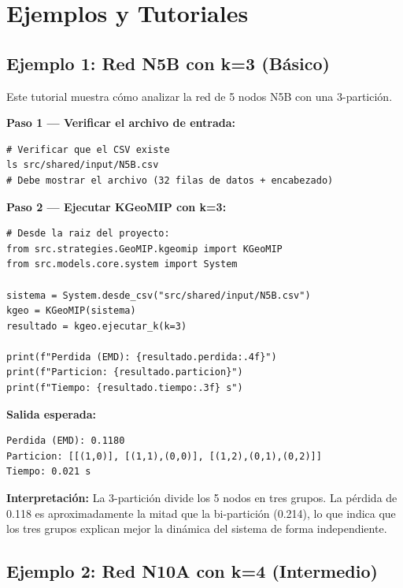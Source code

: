 \section{Ejemplos y Tutoriales}
\label{sec:ejemplos}

\subsection{Ejemplo 1: Red N5B con k=3 (Básico)}

Este tutorial muestra cómo analizar la red de 5 nodos N5B con una 3-partición.

\textbf{Paso 1 — Verificar el archivo de entrada:}

\begin{lstlisting}[style=shell]
# Verificar que el CSV existe
ls src/shared/input/N5B.csv
# Debe mostrar el archivo (32 filas de datos + encabezado)
\end{lstlisting}

\textbf{Paso 2 — Ejecutar KGeoMIP con k=3:}

\begin{lstlisting}[style=python, caption={Ejecutar KGeoMIP sobre N5B con 3 grupos.}]
# Desde la raiz del proyecto:
from src.strategies.GeoMIP.kgeomip import KGeoMIP
from src.models.core.system import System

sistema = System.desde_csv("src/shared/input/N5B.csv")
kgeo = KGeoMIP(sistema)
resultado = kgeo.ejecutar_k(k=3)

print(f"Perdida (EMD): {resultado.perdida:.4f}")
print(f"Particion: {resultado.particion}")
print(f"Tiempo: {resultado.tiempo:.3f} s")
\end{lstlisting}

\textbf{Salida esperada:}

\begin{lstlisting}[caption={Salida del ejemplo 1.}]
Perdida (EMD): 0.1180
Particion: [[(1,0)], [(1,1),(0,0)], [(1,2),(0,1),(0,2)]]
Tiempo: 0.021 s
\end{lstlisting}

\textbf{Interpretación:} La 3-partición divide los 5 nodos en tres grupos. La pérdida de 0.118 es aproximadamente la mitad que la bi-partición (0.214), lo que indica que los tres grupos explican mejor la dinámica del sistema de forma independiente.

\subsection{Ejemplo 2: Red N10A con k=4 (Intermedio)}

